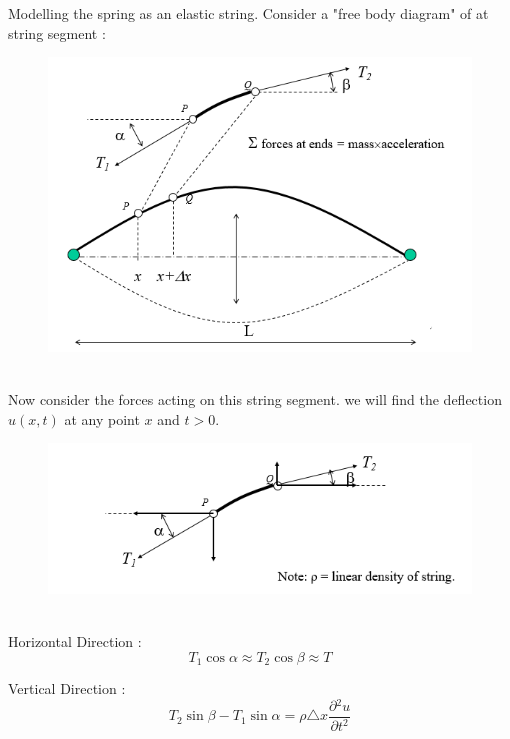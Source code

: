 \documentclass[12pt,a4paper]{article}
\begin{document}
	Modelling the spring as an elastic string. Consider a "free body diagram" of at string segment :
	\begin{figure}[h]
	\begin{center}
		\includegraphics{wave2.PNG}
	\end{center}
	\end{figure}\\
	
	Now consider the forces acting on this string segment. we will find the deflection $u(x,t)$ at any point $x$ and $t>0$.
	\begin{figure}[h]
		\begin{center}
			\includegraphics{wave3.PNG}
		\end{center}
	\end{figure}\\

	Horizontal Direction :
	\begin{equation}\label{}
	T_1 \cos \alpha \approx T_2 \cos \beta \approx T
	\end{equation}
	
	Vertical Direction :
	\begin{equation}\label{}
	T_2 \sin \beta - T_1 \sin \alpha = \rho \triangle x \frac{\partial{^2u}}{\partial{t^2}}  
	\end{equation}
\end{document}

